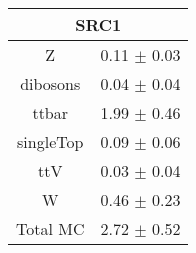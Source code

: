 \begin{tabular}{c|c}
\hline\hline
\multicolumn{2}{c}{\bf SRC1 } \\ \hline 
Z & 0.11 $\pm$ 0.03 \\
dibosons & 0.04 $\pm$ 0.04 \\
ttbar & 1.99 $\pm$ 0.46 \\
singleTop & 0.09 $\pm$ 0.06 \\
ttV & 0.03 $\pm$ 0.04 \\
W & 0.46 $\pm$ 0.23 \\
\hline
Total MC & 2.72 $\pm$ 0.52 \\
\hline\hline
\end{tabular}
